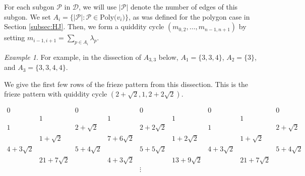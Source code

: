 \documentclass[12pt]{article}
\theoremstyle{remark}
\newtheorem{example}{Example}
\newcommand*{\polyset}[1]{\text{Poly($#1$)}}
\newcommand*{\D}{\mathcal{D}}
\begin{document}
For each subgon $\mathcal{P}$ in $\D$, we will use $|\mathcal{P}|$ denote the number of edges of this subgon. We set $A_i = \{ \vert \mathcal{P} \vert : \mathcal{P} \in \polyset{v_i}\}$, as was defined for the polygon case in Section \ref{subsec:HJ}.
 Then, we form a quiddity cycle $(m_{0,2},\ldots,m_{n-1,n+1})$ by setting $m_{i-1,i+1} = \sum_{p \in A_i} \lambda_p$.

\begin{example}\label{ex:FPfromDissection}
For example, in the dissection of $A_{3,3}$ below, $A_1 = \{3,3,4\}$, $A_2 = \{3\}$, and $A_3 = \{3,3,4,4\}$.

\begin{center}
  \end{center}
  
 We give the first few rows of the frieze pattern from this dissection. This is the frieze pattern with quiddity cycle $(2 + \sqrt{2},1,2 + 2\sqrt{2})$.
 
 \[
 \begin{array}{cccccccccccccccccccc}
  0&&0&&0&&0&&0&&\\
 &1& &1&&1&&1&\\
 1&&2+\sqrt{2}&&2+2\sqrt{2}&&1&&2+\sqrt{2}&&\\
&1+\sqrt{2}& &7 + 6\sqrt{2}&&1+2\sqrt{2}&&1+\sqrt{2}&\\
  4+3\sqrt{2}&&5+4\sqrt{2}&&5+5\sqrt{2}&&4+3\sqrt{2}&&5+4\sqrt{2}&&\\
&21+7\sqrt{2}& &4 + 3\sqrt{2}&&13+9\sqrt{2}&&21+7\sqrt{2}&\\
  & &&&\vdots&&&&&\\
 \end{array}
 \]
\end{example}
\end{document}

